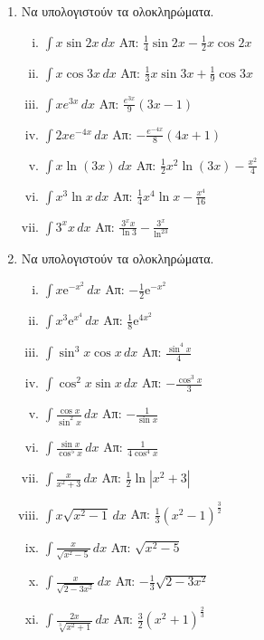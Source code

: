 \documentclass[a4paper,table]{report}
\begin{document}
\begin{center}
  \minibox{{\large\bfseries \textcolor{Col1}{Ασκήσεις στα Αόριστα Ολοκληρώματα}}}
\end{center}

\vspace{\baselineskip}


\begin{enumerate}

  \item Να υπολογιστούν τα ολοκληρώματα.
    \begin{enumerate}[i)]
      \item $\int x\sin2x \, dx$ \hfill Απ: $\frac{1}{4}\sin2x-\frac{1}{2}x\cos2x$
      \item $\int x\cos3x \, dx$ \hfill Απ: $\frac{1}{3}x\sin3x+ \frac{1}{9}\cos3x$
      \item $\int xe^{3x} \, dx$ \hfill Απ: $\frac{e^{3x}}{9}(3x-1)$
      \item $\int 2xe^{-4x} \, dx$ \hfill Απ: $-\frac{e^{-4x}}{8}(4x+1)$
      \item $ \int x \ln{(3x)} \,{dx} $ \hfill Απ: $ \frac{1}{2} x^{2} \ln{(3x)} -
        \frac{x^{2}}{4} $ 
      \item $ \int x^{3} \ln{x} \,{dx} $ \hfill Απ: $ \frac{1}{4} x^{4} \ln{x} -
        \frac{x^{4}}{16} $
      \item $\int 3^{x}x \, dx$ \hfill Απ: $\frac{3^xx}{\ln3}-\frac{3^x}{\ln^23}$
    \end{enumerate}

  \item Να υπολογιστούν τα ολοκληρώματα.
    \begin{enumerate}[i)]
      \item $ \int x \mathrm{e}^{-x^2} \,{dx} $ \hfill Απ: $ - \frac{1}{2}
        \mathrm{e}^{-x^{2}} $ 
      \item $ \int x^{3} \mathrm{e}^{x^4} \,{dx} $ \hfill Απ: $ \frac{1}{8}
        \mathrm{e}^{4x^{2}} $ 
      \item $\int \sin^3x\cos x \, dx$ \hfill Απ: $\frac{\sin^{4}x}{4}$
      \item $\int \cos^2x\sin x \, dx$ \hfill Απ: $-\frac{\cos^{3}x}{3}$
      \item $ \int \frac{\cos{x}}{\sin^{2}{x}}  \,{dx} $ \hfill Απ: $ -
        \frac{1}{\sin{x}} $ 
      \item $ \int \frac{\sin{x}}{\cos^{5}{x}}  \,{dx} $ \hfill Απ: $ 
        \frac{1}{4\cos^{4}{x}} $ 
      \item $\int\frac{x}{x^2+3} \, dx$ \hfill Απ: $\frac{1}{2}\ln|x^2+3|$
      \item $ \int x \sqrt{x^{2}-1} \,{dx} $ 
        \hfill Απ: $ \frac{1}{3} (x^{2}-1)^{\frac{3}{2}} $  
      \item $\int\frac{x}{\sqrt{x^{2}-5}} \, dx$ \hfill Απ: $ \sqrt{x^{2}-5} $
      \item $\int\frac{x}{\sqrt{2-3x^{2}}} \, dx$ \hfill Απ: $ - \frac{1}{3}
      \sqrt{2-3x^{2}} $
      \item $ \int \frac{2x}{\sqrt[3]{x^{2}+1}} \,{dx} $ 
        \hfill Απ: $ \frac{3}{2} (x^{2}+1)^{\frac{2}{3}} $ 
    \end{enumerate}

\end{enumerate}
\end{document}
